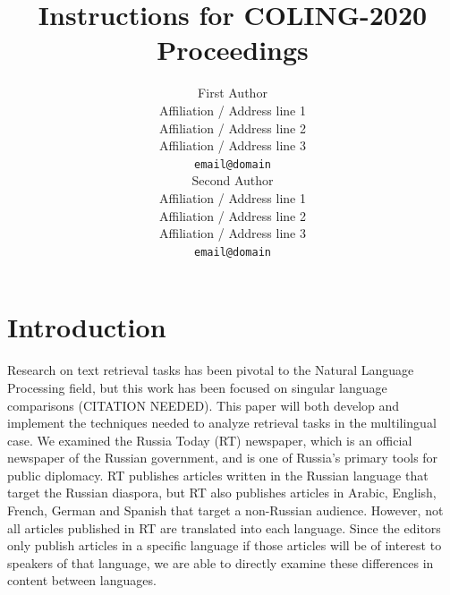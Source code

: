 \documentclass[11pt]{article}
\title{Instructions for COLING-2020 Proceedings}
\author{First Author \\
  Affiliation / Address line 1 \\
  Affiliation / Address line 2 \\
  Affiliation / Address line 3 \\
  {\tt email@domain} \\\And
  Second Author \\
  Affiliation / Address line 1 \\
  Affiliation / Address line 2 \\
  Affiliation / Address line 3 \\
  {\tt email@domain} \\}
\date{}
\begin{document}
\maketitle
\begin{abstract}
\end{abstract}

%
% 

\section{Introduction}
\label{sec:intro}


Research on text retrieval tasks has been pivotal to the Natural Language Processing field, but this work has been focused on singular language comparisons (CITATION NEEDED). This paper will both develop and implement the techniques needed to analyze retrieval tasks in the multilingual case. We examined the Russia Today (RT) newspaper, which is an official newspaper of the Russian government, and is one of Russia's primary tools for public diplomacy. RT publishes articles written in the Russian language that target the Russian diaspora, but RT also publishes articles in Arabic, English, French, German and Spanish that target a non-Russian audience. However, not all articles published in RT are translated into each language. Since the editors only publish articles in a specific language if those articles will be of interest to speakers of that language, we are able to directly examine these differences in content between languages. 
\end{document}
